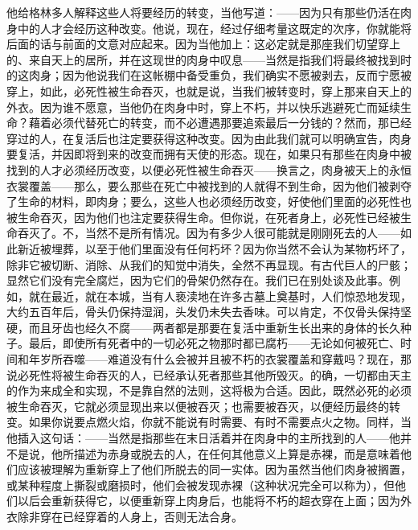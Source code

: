 他给格林多人解释这些人将要经历的转变，当他写道：——因为只有那些仍活在肉身中的人才会经历这种改变。他说，现在，经过仔细考量这既定的次序，你就能将后面的话与前面的文意对应起来。因为当他加上：这必定就是那座我们切望穿上的、来自天上的居所，并在这现世的肉身中叹息——当然是指我们将最终被找到时的这肉身；因为他说我们在这帐棚中备受重负，我们确实不愿被剥去，反而宁愿被穿上，如此，必死性被生命吞灭，也就是说，当我们被转变时，穿上那来自天上的外衣。因为谁不愿意，当他仍在肉身中时，穿上不朽，并以快乐逃避死亡而延续生命？藉着必须代替死亡的转变，而不必遭遇那要追索最后一分钱的？然而，那已经穿过的人，在复活后也注定要获得这种改变。因为由此我们就可以明确宣告，肉身要复活，并因即将到来的改变而拥有天使的形态。现在，如果只有那些在肉身中被找到的人才必须经历改变，以便必死性被生命吞灭——换言之，肉身被天上的永恒衣裳覆盖——那么，要么那些在死亡中被找到的人就得不到生命，因为他们被剥夺了生命的材料，即肉身；要么，这些人也必须经历改变，好使他们里面的必死性也被生命吞灭，因为他们也注定要获得生命。但你说，在死者身上，必死性已经被生命吞灭了。不，当然不是所有情况。因为有多少人很可能就是刚刚死去的人——如此新近被埋葬，以至于他们里面没有任何朽坏？因为你当然不会认为某物朽坏了，除非它被切断、消除、从我们的知觉中消失，全然不再显现。有古代巨人的尸骸；显然它们没有完全腐烂，因为它们的骨架仍然存在。我们已在别处谈及此事。例如，就在最近，就在本城，当有人亵渎地在许多古墓上奠基时，人们惊恐地发现，大约五百年后，骨头仍保持湿润，头发仍未失去香味。可以肯定，不仅骨头保持坚硬，而且牙齿也经久不腐——两者都是那要在复活中重新生长出来的身体的长久种子。最后，即使所有死者中的一切必死之物那时都已腐朽——无论如何被死亡、时间和年岁所吞噬——难道没有什么会被并且被不朽的衣裳覆盖和穿戴吗？现在，那说必死性将被生命吞灭的人，已经承认死者那些其他所毁灭。的确，一切都由天主的作为来成全和实现，不是靠自然的法则，这将极为合适。因此，既然必死的必须被生命吞灭，它就必须显现出来以便被吞灭；也需要被吞灭，以便经历最终的转变。如果你说要点燃火焰，你就不能说有时需要、有时不需要点火之物。同样，当他插入这句话：——当然是指那些在末日活着并在肉身中的主所找到的人——他并不是说，他所描述为赤身或脱去的人，在任何其他意义上算是赤裸，而是意味着他们应该被理解为重新穿上了他们所脱去的同一实体。因为虽然当他们肉身被搁置，或某种程度上撕裂或磨损时，他们会被发现赤裸（这种状况完全可以称为），但他们以后会重新获得它，以便重新穿上肉身后，也能将不朽的超衣穿在上面；因为外衣除非穿在已经穿着的人身上，否则无法合身。\par

